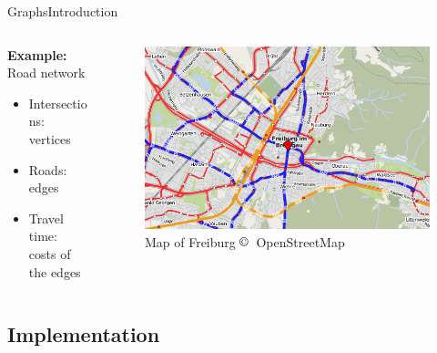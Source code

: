\begin{frame}{Graphs}{Introduction}
  \begin{columns}
    \begin{column}{0.40\linewidth}
      \textbf{Example:} Road network
      \begin{itemize}
        \item<2->
          Intersections: {\color{MainA}vertices}
        \item<3->
          Roads: {\color{MainA}edges}
        \item<4->
          Travel time:\\
          {\color{MainA}costs of the edges}
      \end{itemize}
    \end{column}
    \begin{column}{0.6\linewidth}
      \begin{figure}[!h]
        \includegraphics[width=\linewidth]
          {Images/Graphs/Freiburg_OpenStreetMap.png}
        \caption{Map of Freiburg $\copyright$~OpenStreetMap}
        \label{fig:graphs:introduction_freiburg_osm}
      \end{figure}
    \end{column}
  \end{columns}
\end{frame}



\subsection{Implementation}

